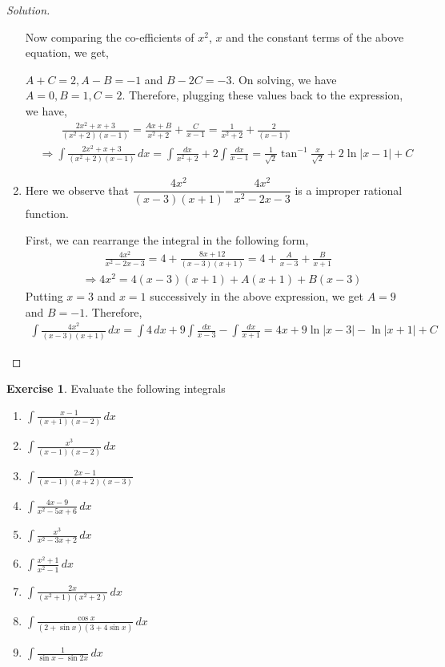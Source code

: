 \documentclass{book}
\theoremstyle{definition}
\newtheorem{exercise}{Exercise}[section]
\newenvironment{solution}
    {\begin{proof}[Solution]}
    {\end{proof}}
\begin{document}
\begin{solution}
\begin{enumerate}[label=(\roman*)]
Now comparing the co-efficients of $x^2$, $x$ and the constant terms of the above equation, we get, 

$A+C=2, A-B=-1$ and $B-2C=-3$. On solving, we have $A=0, B=1, C=2$.
Therefore, plugging these values back to the expression, we have,
\begin{align*}
&\qquad \frac{2x^2+x+3}{(x^2+2)(x-1)}=\frac{Ax+B}{x^2+2}+\frac{C}{x-1}=\frac{1}{x^2+2}+\frac{2}{(x-1)} \\
&\Rightarrow \int\frac{2x^2+x+3}{(x^2+2)(x-1)}\,dx = \int\frac{dx}{x^2+2}+2\int\frac{dx}{x-1} = \frac{1}{\sqrt{2}}\tan^{-1}\frac{x}{\sqrt{2}}+2\ln|x-1|+C
\end{align*}

\item Here we observe that $\dfrac{4x^2}{(x-3)(x+1)}$=$\dfrac{4x^2}{x^2-2x-3}$ is a improper rational function.

First, we can rearrange the integral in the following form, 
\begin{align*}
    &\qquad \frac{4x^2}{x^2-2x-3} = 4+\frac{8x+12}{(x-3)(x+1)} = 4+\frac{A}{x-3}+\frac{B}{x+1} \\
    &\Rightarrow 4x^2=4(x-3)(x+1)+A(x+1)+B(x-3)
\end{align*}
Putting $x=3$ and $x=1$ successively in the above expression, we get $A=9$ and $B=-1$. Therefore,
\begin{align*}
    \int \frac{4x^2}{(x-3)(x+1)}\,dx = \int4\,dx+9\int\frac{dx}{x-3}-\int\frac{dx}{x+1}=4x+9\ln|x-3|-\ln|x+1|+C
\end{align*}

\end{enumerate} 
\end{solution}

\begin{exercise}
Evaluate the following integrals
\begin{multicols}{3}
\begin{enumerate}[label=(\roman*)]
    \item $\displaystyle\int \frac{x-1}{(x+1)(x-2)}\,dx$
    \item $\displaystyle\int\frac{x^3}{(x-1)(x-2)}\,dx$
    \item $\displaystyle\int\frac{2x-1}{(x-1)(x+2)(x-3)}$
    \item $\displaystyle\int \frac{4x-9}{x^2-5x+6}\,dx$
    \item $\displaystyle\int \frac{x^3}{x^2-3x+2}\,dx$    
    \item $\displaystyle\int\frac{x^2+1}{x^2-1}\,dx$
    \item $\displaystyle\int \frac{2x}{(x^2+1)(x^2+2)}\,dx$
    \item $\displaystyle\int \frac{\cos x}{(2+\sin x)(3+4\sin x)}\,dx$
    \item $\displaystyle\int\frac{1}{\sin x-\sin 2x}\,dx$

\end{enumerate}
\end{multicols}    
\end{exercise}
\end{document}
